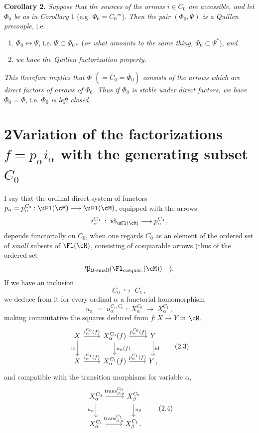 \textbf{Corollary 2.} \textit{Suppose that the sources of the arrows $i\in C_0$ are accessible, and let $\Phi_0$ be as in Corollary} 1 (e.g. $\Phi_0=C_0'''$). \textit{Then the pair $(\Phi_0,\Psi)$ is a Quillen precouple,} i.e.
\begin{enumerate}[label={}, leftmargin=*]
\item[a)] $\Phi_0\longleftrightarrow\Psi$, i.e. $\Psi\subset\Phi_{0*}$ (\textit{or what amounts to the same thing, $\Phi_0\subset\Psi^*$}), \textit{and}
\item[b)] \textit{we have the Quillen factorization property.}
\end{enumerate}
\textit{This therefore implies that $\Phi$ $(=\widetilde{C_0}=\widetilde{\Phi_0})$ consists of the arrows which are direct factors of arrows of $\Phi_0$. Thus if $\Phi_0$ is stable under direct factors, we have $\Phi_0=\Phi$,} i.e. \textit{$\Phi_0$ is left closed.}


\section*{2\quad Variation of the factorizations $f=p_\alpha i_\alpha$ with the generating subset $C_0$}

I say that the ordinal direct system of functors $p_\alpha=p_\alpha^{C_0} : \uFl(\cM)\longrightarrow\uFl(\cM)$,
equipped with the arrows
\[
i_\alpha^{C_0} \;:\; \mathrm{id}_{\uFl(\cM)} \longrightarrow p_\alpha^{C_0}\,,
\]
depends functorially on $C_0$, when one regards $C_0$ as an element of the ordered set of \textit{small} subsets of $\Fl(\cM)$, consisting of cosquarable arrows (thus of the ordered set
\[
\mathfrak{P}_{\mathfrak{U}\text{-small}}(\Fl_{\text{cosquar.}}(\cM)) \quad ).
\]
If we have an inclusion
\[
C_0 \;\hookrightarrow\; C_1\,,
\tag*{(2.1)}
\]
we deduce from it for every ordinal $\alpha$ a functorial homomorphism
\[
u_\alpha \;=\; u_\alpha^{C_1,C_0} \;:\; X_\alpha^{C_0} \;\longrightarrow\; X_\alpha^{C_1}\,,
\tag*{(2.2)}
\]
making commutative the squares deduced from $f : X\longrightarrow Y$ in $\cM$,
\[
\begin{tikzcd}
X \arrow[r, "i_\alpha^{C_0}(f)"] \arrow[d, "\mathrm{id}"'] & X_\alpha^{C_0}(f) \arrow[r, "p_\alpha^{C_0}(f)"] \arrow[d, "u_\alpha(f)"] & Y \arrow[d, "\mathrm{id}"] \\
X \arrow[r, "i_\alpha^{C_1}(f)"] & X_\alpha^{C_1}(f) \arrow[r, "p_\alpha^{C_1}(f)"] & Y\,,
\end{tikzcd}
\tag*{(2.3)}
\]
and compatible with the transition morphisms for variable $\alpha$,
\[
\begin{tikzcd}
X_\alpha^{C_0} \arrow[r, "{\mathrm{trans}_{\beta,\alpha}^{C_0}}"] \arrow[d, "u_\alpha"'] & X_\beta^{C_0} \arrow[d, "u_\beta"] \\
X_\alpha^{C_1} \arrow[r, "{\mathrm{trans}_{\beta,\alpha}^{C_1}}"] & X_\beta^{C_1}\,.
\end{tikzcd}
\tag*{(2.4)}
\]

